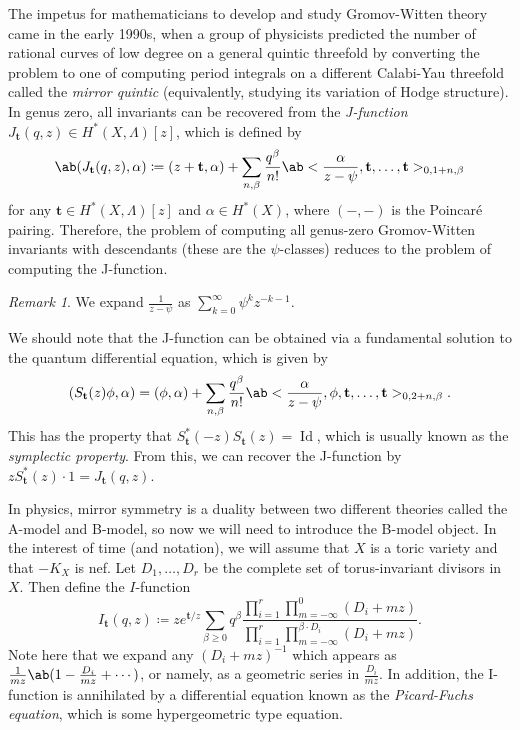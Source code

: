\documentclass{amsart}
\theoremstyle{definition}
\theoremstyle{remark}
\newtheorem{rmk}[thm]{Remark}
\theoremstyle{plain}
\theoremstyle{definition}
\theoremstyle{remark}
\newcommand{\mbf}[1]{\mathbf{#1}}
\newcommand{\on}[1]{\operatorname{#1}}
\newcommand{\1}{\mathbf{1}}
\newcommand{\2}{\mathbf{2}}
\newcommand{\3}{\mathbf{3}}
\begin{document}
The impetus for mathematicians to develop and study Gromov-Witten theory came in the early 1990s, when a group of physicists predicted the number of rational curves of low degree on a general quintic threefold by converting the problem to one of computing period integrals on a different Calabi-Yau threefold called the \textit{mirror quintic} (equivalently, studying its variation of Hodge structure). In genus zero, all invariants can be recovered from the \textit{J-function} \(J_{\mbf{t}}(q,z) \in H^*(X, \Lambda)[z]\), which is defined by
\[ \ab( J_{\mbf{t}}(q, z), \alpha ) \coloneqq (z + \mbf{t}, \alpha) + \sum_{n, \beta} \frac{q^{\beta}}{n!} \ab< \frac{\alpha}{z-\psi}, \mbf{t}, \ldots, \mbf{t}>_{0,1+n, \beta} \]
for any \(\mbf{t} \in H^*(X, \Lambda)[z]\) and \(\alpha \in H^*(X)\), where \((-,-)\) is the Poincar\'e pairing. Therefore, the problem of computing all genus-zero Gromov-Witten invariants with descendants (these are the \(\psi\)-classes) reduces to the problem of computing the J-function.

\begin{rmk}
    We expand \(\frac{1}{z-\psi}\) as \(\sum_{k=0}^{\infty} \psi^k z^{-k-1}\).  
\end{rmk}

We should note that the J-function can be obtained via a fundamental solution to the quantum differential equation, which is given by
\[ ( S_{\mbf{t}}(z) \phi , \alpha) = (\phi, \alpha) + \sum_{n, \beta} \frac{q^{\beta}}{n!} \ab<\frac{\alpha}{z-\psi}, \phi, \mbf{t}, \ldots, \mbf{t}>_{0, 2+n, \beta}. \]
This has the property that \(S_{\mbf{t}}^*(-z) S_{\mbf{t}}(z) = \on{Id}\), which is usually known as the \textit{symplectic property}. From this, we can recover the J-function by \(z S_{\mbf{t}}^*(z)\cdot 1 = J_{\mbf{t}}(q, z)\).

In physics, mirror symmetry is a duality between two different theories called the A-model and B-model, so now we will need to introduce the B-model object. In the interest of time (and notation), we will assume that \(X\) is a toric variety and that \(-K_X\) is nef. Let \(D_1, \ldots, D_r\) be the complete set of torus-invariant divisors in \(X\). Then define the \(I\)-function
\[
    I_{\mbf{t}}(q, z) \coloneqq z e^{\mbf{t}/z} \sum_{\beta \geq 0} q^{\beta} \frac{\prod_{i=1}^r \prod_{m = -\infty}^{0} (D_i + mz)}{\prod_{i=1}^r \prod_{m=-\infty}^{\beta \cdot D_i} (D_i + mz)}.
\]
Note here that we expand any \((D_i + mz)^{-1}\) which appears as \(\frac{1}{mz} \ab(1 - \frac{D_i}{mz} + \cdots)\), or namely, as a geometric series in \(\frac{D_i}{mz}\). In addition, the I-function is annihilated by a differential equation known as the \textit{Picard-Fuchs equation}, which is some hypergeometric type equation.
\end{document}
